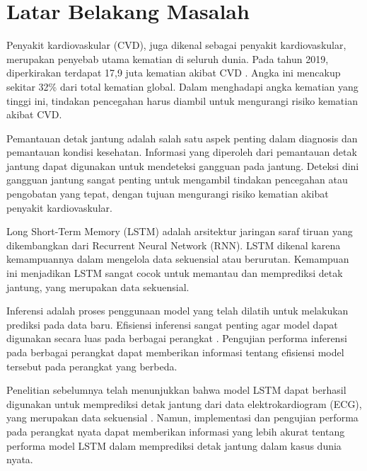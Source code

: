 
\section{Latar Belakang Masalah}

Penyakit kardiovaskular (CVD), juga dikenal sebagai penyakit kardiovaskular, merupakan penyebab utama kematian di seluruh dunia. Pada tahun 2019, diperkirakan terdapat 17,9 juta kematian akibat CVD \parencite{worldhealthorganizationCardiovascularDiseasesCVDs2021}. Angka ini mencakup sekitar 32\% dari total kematian global. Dalam menghadapi angka kematian yang tinggi ini, tindakan pencegahan harus diambil untuk mengurangi risiko kematian akibat CVD.

Pemantauan detak jantung adalah salah satu aspek penting dalam diagnosis dan pemantauan kondisi kesehatan.
Informasi yang diperoleh dari pemantauan detak jantung dapat digunakan untuk mendeteksi gangguan pada jantung.
Deteksi dini gangguan jantung sangat penting untuk mengambil tindakan pencegahan atau pengobatan yang tepat, dengan tujuan mengurangi risiko kematian akibat penyakit kardiovaskular.

Long Short-Term Memory (LSTM) adalah arsitektur jaringan saraf tiruan yang dikembangkan dari Recurrent Neural Network (RNN). LSTM dikenal karena kemampuannya dalam mengelola data sekuensial atau berurutan. Kemampuan ini menjadikan LSTM sangat cocok untuk memantau dan memprediksi detak jantung, yang merupakan data sekuensial.

Inferensi adalah proses penggunaan model yang telah dilatih untuk melakukan prediksi pada data baru. Efisiensi inferensi sangat penting agar model dapat digunakan secara luas pada berbagai perangkat \parencite{ulkerReviewingInferencePerformance2020}. Pengujian performa inferensi pada berbagai perangkat dapat memberikan informasi tentang efisiensi model tersebut pada perangkat yang berbeda.

Penelitian sebelumnya telah menunjukkan bahwa model LSTM dapat berhasil digunakan untuk memprediksi detak jantung dari data elektrokardiogram (ECG), yang merupakan data sekuensial \parencite{shchetininArrhythmiaDetectionUsing2022}. Namun, implementasi dan pengujian performa pada perangkat nyata dapat memberikan informasi yang lebih akurat tentang performa model LSTM dalam memprediksi detak jantung dalam kasus dunia nyata.

